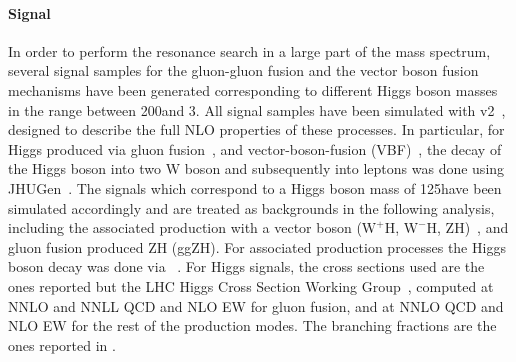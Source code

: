 \paragraph{Signal}  In order to perform the resonance search in a large part of the mass spectrum, several signal samples for the gluon-gluon fusion and the vector boson fusion mechanisms have been generated corresponding to different Higgs boson masses in the range between 200\GeV and 3\TeV. 
All signal samples have been simulated with \POWHEG v2~\cite{Nason:2004rx,Frixione:2007vw,Alioli:2010xd}, designed to describe the full NLO properties of these processes. In particular, for Higgs produced via gluon fusion~\cite{Alioli:2008tz}, and vector-boson-fusion (VBF)~\cite{Nason:2009ai},
the decay of the Higgs boson into two W boson and subsequently into leptons was done using JHUGen~\cite{jhugen}. 
The signals which correspond to a Higgs boson mass of 125\GeV have been simulated accordingly and are treated as backgrounds in the following analysis, including the associated production with a vector boson ($\mathrm{W^{+}H}$, $\mathrm{W^{-}H}$, ZH)~\cite{Luisoni:2013kna}, and gluon fusion produced ZH (ggZH). For associated production processes the Higgs boson decay was done via ~\cite{Sjostrand:2007gs}.
For Higgs signals, the cross sections used are the ones reported but the LHC Higgs Cross Section Working Group~\cite{temphiggsxsecs},
computed at NNLO and NNLL QCD and NLO EW for gluon fusion, and at NNLO QCD and NLO EW for the rest of the production modes.
The branching fractions are the ones reported in \cite{Heinemeyer:2013tqa}. 




